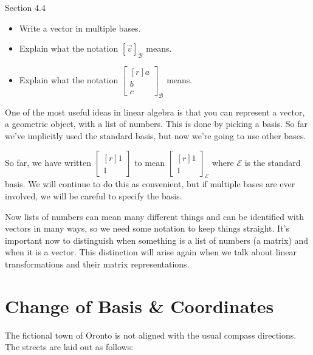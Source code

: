 \documentclass{problemset}
\newcommand{\mat}[1]{\begin{bmatrix*}[r]#1\end{bmatrix*}}
\begin{document}
\begin{lesson}
	\newpage

	Section 4.4

	\begin{itemize}
		\item Write a vector in multiple bases.
		\item Explain what the notation $[\vec v]_{\mathcal B}$ means.
		\item Explain what the notation $\mat{a\\b\\c}_{\mathcal B}$ means.
	\end{itemize}

	One of the most useful ideas in linear algebra is that you can
	represent a vector, a geometric object, with a list of numbers. This
	is done by picking a basis. So far we've implicitly used the standard basis,
	but now we're going to use other bases.

	\begin{annotation}
		\begin{notes}
			So far, we have written $\mat{1\\1}$ to mean
			$\mat{1\\1}_{\mathcal E}$ where $\mathcal E$ is the
			standard basis. We will continue to do this as convenient,
			but if multiple bases are ever involved, we will be careful
			to specify the basis.
		\end{notes}
	\end{annotation}
	Now lists of numbers can mean many different things and can be identified
	with vectors in many ways, so we need some notation to keep things straight.
	It's important now to distinguish when something is a list of numbers (a matrix)
	and when it is a vector. This distinction will arise again when
	we talk about linear transformations and their matrix representations.

	\newpage
\end{lesson}
\section*{Change of Basis \& Coordinates}

	\question
	The fictional town of Oronto is not aligned with the usual
	compass directions. The streets are laid out as follows:
	
\end{document}
